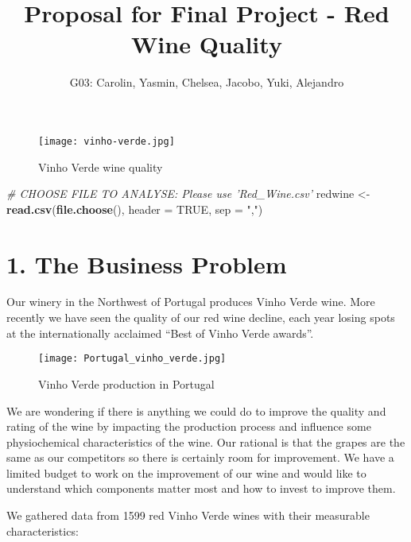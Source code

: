 \documentclass[]{article}
\title{Proposal for Final Project - Red Wine Quality}
\author{G03: Carolin, Yasmin, Chelsea, Jacobo, Yuki, Alejandro}
\date{}
\newenvironment{Shaded}{\begin{snugshade}}{\end{snugshade}}
\newcommand{\CommentTok}[1]{\textcolor[rgb]{0.56,0.35,0.01}{\textit{#1}}}
\newcommand{\DataTypeTok}[1]{\textcolor[rgb]{0.13,0.29,0.53}{#1}}
\newcommand{\KeywordTok}[1]{\textcolor[rgb]{0.13,0.29,0.53}{\textbf{#1}}}
\newcommand{\NormalTok}[1]{#1}
\newcommand{\OtherTok}[1]{\textcolor[rgb]{0.56,0.35,0.01}{#1}}
\newcommand{\StringTok}[1]{\textcolor[rgb]{0.31,0.60,0.02}{#1}}
\begin{document}
\maketitle

\begin{figure}
\centering
\texttt{[image: vinho-verde.jpg]}
\caption{Vinho Verde wine quality}
\end{figure}

\begin{Shaded}
\begin{Highlighting}[]
\CommentTok{# CHOOSE FILE TO ANALYSE: Please use 'Red_Wine.csv'}
\NormalTok{redwine <-}\StringTok{ }\KeywordTok{read.csv}\NormalTok{(}\KeywordTok{file.choose}\NormalTok{(), }\DataTypeTok{header =} \OtherTok{TRUE}\NormalTok{, }\DataTypeTok{sep =} \StringTok{","}\NormalTok{)}
\end{Highlighting}
\end{Shaded}

\clearpage

\hypertarget{the-business-problem}{%
\section{1. The Business Problem}\label{the-business-problem}}

Our winery in the Northwest of Portugal produces Vinho Verde wine. More
recently we have seen the quality of our red wine decline, each year
losing spots at the internationally acclaimed ``Best of Vinho Verde
awards''.

\begin{figure}
\centering
\texttt{[image: Portugal\_vinho\_verde.jpg]}
\caption{Vinho Verde production in Portugal}
\end{figure}

We are wondering if there is anything we could do to improve the quality
and rating of the wine by impacting the production process and influence
some physiochemical characteristics of the wine. Our rational is that
the grapes are the same as our competitors so there is certainly room
for improvement. We have a limited budget to work on the improvement of
our wine and would like to understand which components matter most and
how to invest to improve them.

We gathered data from 1599 red Vinho Verde wines with their measurable
characteristics:
\end{document}
